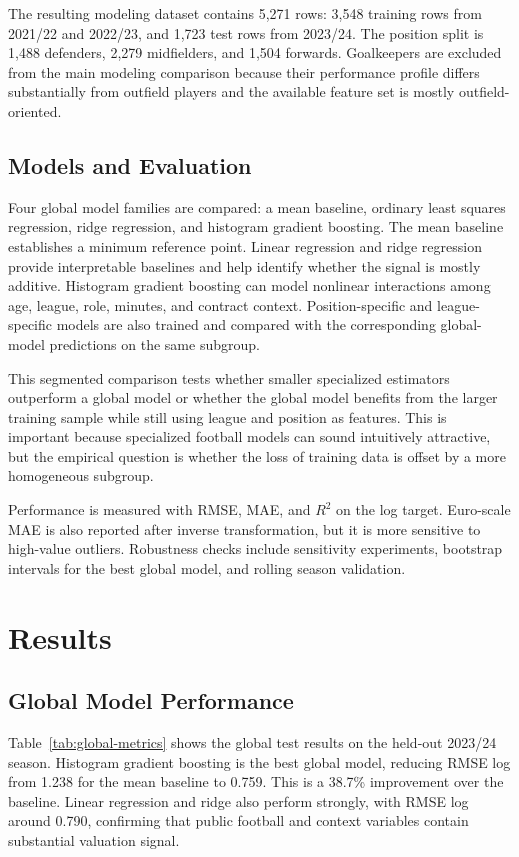 \documentclass[conference]{IEEEtran}
\begin{document}
The resulting modeling dataset contains 5,271 rows: 3,548 training rows from 2021/22 and 2022/23, and 1,723 test rows from 2023/24. The position split is 1,488 defenders, 2,279 midfielders, and 1,504 forwards. Goalkeepers are excluded from the main modeling comparison because their performance profile differs substantially from outfield players and the available feature set is mostly outfield-oriented.

\subsection{Models and Evaluation}
Four global model families are compared: a mean baseline, ordinary least squares regression, ridge regression, and histogram gradient boosting. The mean baseline establishes a minimum reference point. Linear regression and ridge regression provide interpretable baselines and help identify whether the signal is mostly additive. Histogram gradient boosting can model nonlinear interactions among age, league, role, minutes, and contract context. Position-specific and league-specific models are also trained and compared with the corresponding global-model predictions on the same subgroup.

This segmented comparison tests whether smaller specialized estimators outperform a global model or whether the global model benefits from the larger training sample while still using league and position as features. This is important because specialized football models can sound intuitively attractive, but the empirical question is whether the loss of training data is offset by a more homogeneous subgroup.

Performance is measured with RMSE, MAE, and \(R^2\) on the log target. Euro-scale MAE is also reported after inverse transformation, but it is more sensitive to high-value outliers. Robustness checks include sensitivity experiments, bootstrap intervals for the best global model, and rolling season validation.

\section{Results}
\subsection{Global Model Performance}
Table~\ref{tab:global-metrics} shows the global test results on the held-out 2023/24 season. Histogram gradient boosting is the best global model, reducing RMSE log from 1.238 for the mean baseline to 0.759. This is a 38.7\% improvement over the baseline. Linear regression and ridge also perform strongly, with RMSE log around 0.790, confirming that public football and context variables contain substantial valuation signal.
\end{document}
